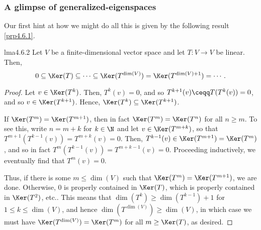 \subsubsection{A glimpse of generalized-eigenspaces}

Our first hint at how we might do all this is given by the following result \cref{prp4.6.1}.
\begin{prp}{}{lma4.6.2}
	Let $V$ be a finite-dimensional vector space and let $T\colon V\rightarrow V$ be linear.  Then,
	\begin{equation}
	0\subseteq \Ker (T)\subseteq \cdots \subseteq \Ker (T^{\dim (V)})=\Ker (T^{\dim (V)+1})=\cdots .
	\end{equation}
	\begin{proof}
		Let $v\in \Ker (T^k)$.  Then, $T^k(v)=0$, and so $T^{k+1}(v)\ceqq T(T^k(v))=0$, and so $v\in \Ker (T^{k+1})$.  Hence, $\Ker (T^k)\subseteq \Ker (T^{k+1})$.
		
		If $\Ker (T^m)=\Ker (T^{m+1})$, then in fact $\Ker (T^m)=\Ker (T^n)$ for all $n\geq m$.  To see this, write $n=m+k$ for $k\in \N$ and let $v\in \Ker (T^{m+k})$, so that $T^{m+1}(T^{k-1}(v))=T^{m+k}(v)=0$.  Then, $T^{k-1}(v)\in \Ker (T^{m+1})=\Ker (T^m)$, and so in fact $T^m(T^{k-1}(v))=T^{m+k-1}(v)=0$.  Proceeding inductively, we eventually find that $T^m(v)=0$.
		
		Thus, if there is some $m\leq \dim (V)$ such that $\Ker (T^m)=\Ker (T^{m+1})$, we are done.  Otherwise, $0$ is properly contained in $\Ker (T)$, which is properly contained in $\Ker (T^2)$, etc..  This means that $\dim (T^k)\geq \dim (T^{k-1})+1$ for $1\leq k\leq \dim (V)$, and hence $\dim (T^{\dim (V)})\geq \dim (V)$, in which case we must have $\Ker (T^{\dim (V)})=\Ker (T^m)$ for all $m\geq \Ker (T)$, as desired.
	\end{proof}
\end{prp}

